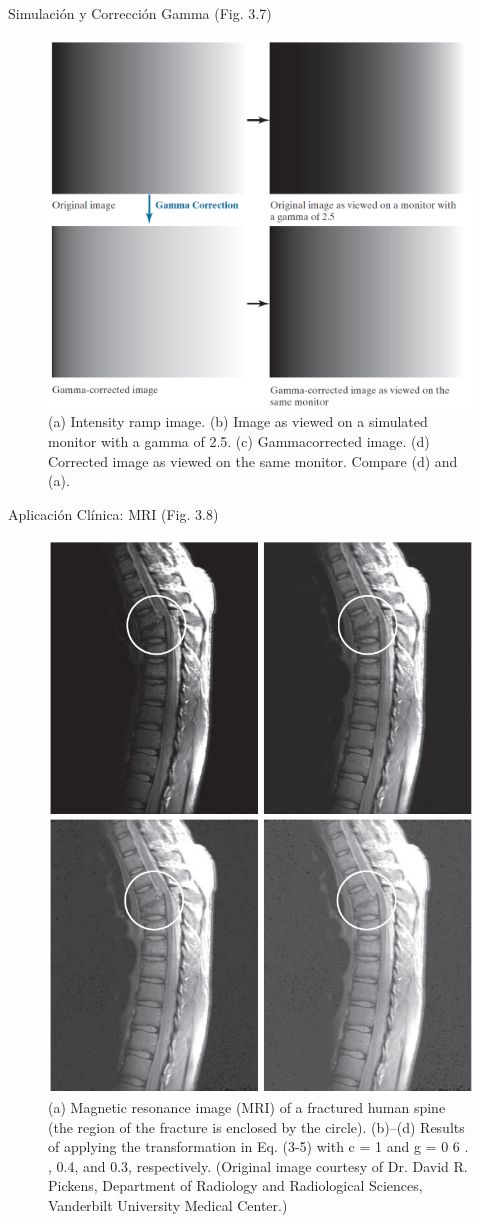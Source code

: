 \documentclass{beamer}
\begin{document}
\begin{frame}{Simulaci\'on y Correcci\'on Gamma (Fig. 3.7)}
\centering
\begin{figure}
\includegraphics[width=0.6\linewidth]{figuras/Fig_3_7.png}
\caption{\footnotesize{(a) Intensity ramp
image. (b) Image
as viewed on a
simulated monitor
with a gamma of
2.5. (c) Gammacorrected
image.
(d) Corrected
image as viewed
on the same
monitor. Compare
(d) and (a).}}
\end{figure}
\end{frame}

\begin{frame}{Aplicaci\'on Cl\'inica: MRI (Fig. 3.8)}
\centering
\begin{figure}
\includegraphics[width=0.4\linewidth]{figuras/Fig_3_8.png}
\caption{\tiny{(a) Magnetic
resonance
image (MRI) of a
fractured human
spine (the region
of the fracture is
enclosed by the
circle).
(b)–(d) Results of
applying the
transformation
in Eq. (3-5)
with c = 1 and
g = 0 6 . , 0.4, and
0.3, respectively.
(Original image
courtesy of Dr.
David R. Pickens,
Department of
Radiology and
Radiological
Sciences,
Vanderbilt
University
Medical Center.)}}
\end{figure}
\end{frame}
\end{document}
